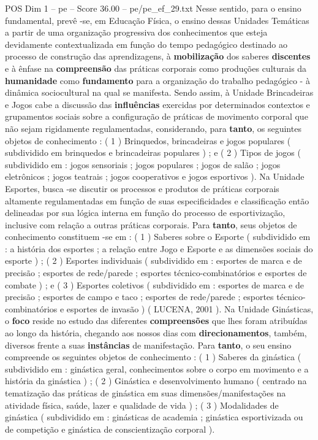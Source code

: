 \begin{textsample}{POS Dim 1 – pe – Score 36.00 – pe/pe\_ef\_29.txt}
Nesse sentido, para o ensino fundamental, prevê -se, em Educação Física, o ensino dessas Unidades Temáticas a partir de uma organização progressiva dos conhecimentos que esteja devidamente contextualizada em função do tempo pedagógico destinado ao processo de construção das aprendizagens, à \textbf{mobilização} dos saberes \textbf{discentes} e à ênfase na \textbf{compreensão} das práticas corporais como produções culturais da \textbf{humanidade} como \textbf{fundamento} para a organização do trabalho pedagógico - à dinâmica sociocultural na qual se manifesta.
Sendo assim, à Unidade Brincadeiras e Jogos cabe a discussão das \textbf{influências} exercidas por determinados contextos e grupamentos sociais sobre a configuração de práticas de movimento corporal que não sejam rigidamente regulamentadas, considerando, para \textbf{tanto}, os seguintes objetos de conhecimento : ( 1 ) Brinquedos, brincadeiras e jogos populares ( subdividido em brinquedos e brincadeiras populares ) ; e ( 2 ) Tipos de jogos ( subdividido em : jogos sensoriais ; jogos populares ; jogos de salão ; jogos eletrônicos ; jogos teatrais ; jogos cooperativos e jogos esportivos ).
Na Unidade Esportes, busca -se discutir os processos e produtos de práticas corporais altamente regulamentadas em função de suas especificidades e classificação então delineadas por sua lógica interna em função do processo de esportivização, inclusive com relação a outras práticas corporais.
Para \textbf{tanto}, seus objetos de conhecimento constituem -se em : ( 1 ) Saberes sobre o Esporte ( subdividido em : a história dos esportes ; a relação entre Jogo e Esporte e as dimensões sociais do esporte ) ; ( 2 ) Esportes individuais ( subdividido em : esportes de marca e de precisão ; esportes de rede/parede ; esportes técnico-combinatórios e esportes de combate ) ; e ( 3 ) Esportes coletivos ( subdividido em : esportes de marca e de precisão ; esportes de campo e taco ; esportes de rede/parede ; esportes técnico-combinatórios e esportes de invasão ) ( LUCENA, 2001 ).
Na Unidade Ginásticas, o \textbf{foco} reside no estudo das diferentes \textbf{compreensões} que lhes foram atribuídas ao longo da história, chegando aos nossos dias com \textbf{direcionamentos}, também, diversos frente a suas \textbf{instâncias} de manifestação.
Para \textbf{tanto}, o seu ensino compreende os seguintes objetos de conhecimento : ( 1 ) Saberes da ginástica ( subdividido em : ginástica geral, conhecimentos sobre o corpo em movimento e a história da ginástica ) ; ( 2 ) Ginástica e desenvolvimento humano ( centrado na tematização das práticas de ginástica em suas dimensões/manifestações na atividade física, saúde, lazer e qualidade de vida ) ; ( 3 ) Modalidades de ginástica ( subdividido em : ginásticas de academia ; ginástica esportivizada ou de competição e ginástica de conscientização corporal ).

\end{textsample}
